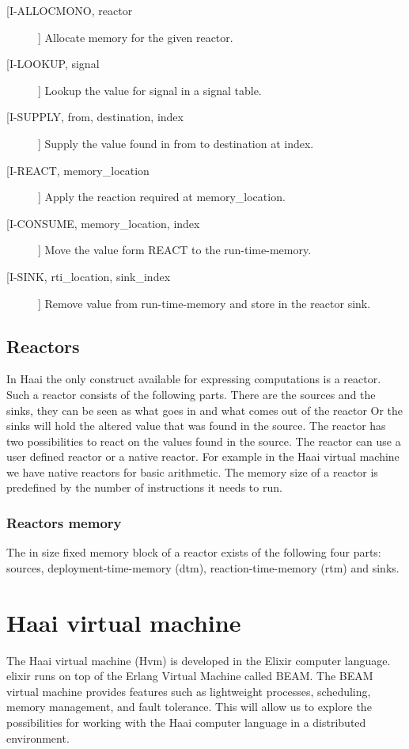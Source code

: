 \documentclass[a4paper]{book}
\begin{document}
\begin{description}
	\item[[I-ALLOCMONO, reactor]] Allocate memory for the given reactor.
	\item[[I-LOOKUP, signal]] Lookup the value for signal in a signal table.
	\item[[I-SUPPLY, from, destination, index]] Supply the value found in from to destination at index.
	\item[[I-REACT, memory\_location]] Apply the reaction required at memory\_location.
	\item[[I-CONSUME, memory\_location, index]] Move the value form REACT to the run-time-memory.
	\item[[I-SINK, rti\_location, sink\_index]] Remove value from run-time-memory and store in the reactor sink.
\end{description}

\section{Reactors}
In Haai the only construct available for expressing computations is a reactor. Such a reactor consists of the following parts. There are the sources and the sinks, they can be seen as what goes in and what comes out of the reactor Or the sinks will hold the altered value that was found in the source. The reactor has two possibilities to react on the values found in the source. The reactor can use a user defined reactor or a native reactor. For example in the Haai virtual machine we have native reactors for basic arithmetic. The memory size of a reactor is predefined by the number of instructions it needs to run. 
\subsection{Reactors memory}
The in size fixed memory block of a reactor exists of the following four parts: sources, deployment-time-memory (dtm), reaction-time-memory (rtm) and sinks.   



\chapter{Haai virtual machine}
The Haai virtual machine (Hvm) is developed in the Elixir computer language. elixir runs on top of the Erlang Virtual Machine called BEAM. The BEAM virtual machine provides features such as lightweight processes, scheduling, memory management, and fault tolerance. This will allow us to explore the possibilities for working with the Haai computer language in a distributed environment.
\end{document}
